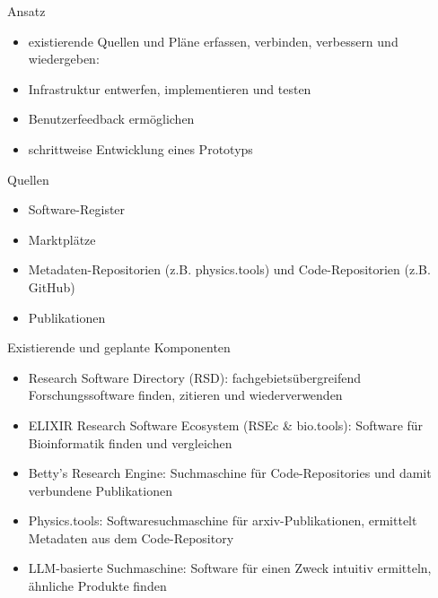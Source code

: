 \documentclass[aspectratio=1610,12pt]{beamer}
\begin{document}
\begin{frame}{Ansatz}
\begin{itemize}
\item existierende Quellen und Pläne erfassen, verbinden, verbessern und wiedergeben:
\item Infrastruktur entwerfen, implementieren und testen
\item Benutzerfeedback ermöglichen
\item schrittweise Entwicklung eines Prototyps
\end{itemize}
\end{frame}

\begin{frame}{Quellen}
\begin{itemize}
\item Software-Register
\item Marktplätze
\item Metadaten-Repositorien (z.B. physics.tools) und Code-Repositorien (z.B. GitHub)
\item Publikationen
\end{itemize}
\end{frame}

\begin{frame}{Existierende und geplante Komponenten}
\begin{itemize}
\item Research Software Directory (RSD): fachgebietsübergreifend Forschungssoftware finden, zitieren und wiederverwenden
\item ELIXIR Research Software Ecosystem (RSEc \& bio.tools): Software für Bioinformatik finden und vergleichen
\item Betty’s Research Engine: Suchmaschine für Code-Repositories und damit verbundene Publikationen
\item Physics.tools: Softwaresuchmaschine für arxiv-Publikationen, ermittelt Metadaten aus dem Code-Repository
\item LLM-basierte Suchmaschine: Software für einen Zweck intuitiv ermitteln, ähnliche Produkte finden
\end{itemize}
\end{frame}

\end{document}

